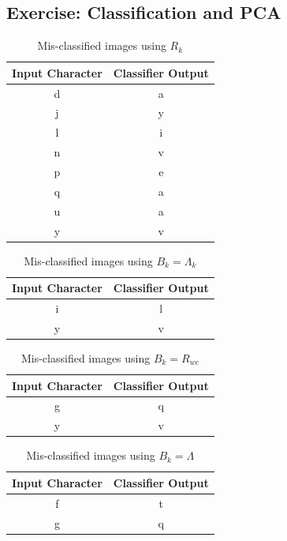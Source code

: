 \documentclass{article}
\begin{document}
\subsection{Exercise: Classification and PCA}
\begin{table}[H]
    \centering
    \begin{tabular}{|c|c|}
        \hline
        Input Character & Classifier Output \\
        \hline
        d & a \\
        \hline
        j & y \\
        \hline
        l & i \\
        \hline
        n & v \\
        \hline
        p & e \\
        \hline
        q & a \\
        \hline
        u & a \\
        \hline
        y & v \\
        \hline
    \end{tabular}
    \caption{Mis-classified images using $R_k$}
\end{table}

\begin{table}[H]
    \centering
    \begin{tabular}{|c|c|}
        \hline
        Input Character & Classifier Output \\
        \hline
        i & l \\
        \hline
        y & v \\
        \hline
    \end{tabular}
    \caption{Mis-classified images using $B_k = \Lambda_k$}
\end{table}

\begin{table}[H]
    \centering
    \begin{tabular}{|c|c|}
        \hline
        Input Character & Classifier Output \\
        \hline
        g & q \\
        \hline
        y & v \\
        \hline
    \end{tabular}
    \caption{Mis-classified images using $B_k = R_{wc}$}
\end{table}

\begin{table}[H]
    \centering
    \begin{tabular}{|c|c|}
        \hline
        Input Character & Classifier Output \\
        \hline
        f & t \\
        \hline
        g & q \\
        \hline
    \end{tabular}
    \caption{Mis-classified images using $B_k = \Lambda$}
\end{table}
\end{document}
